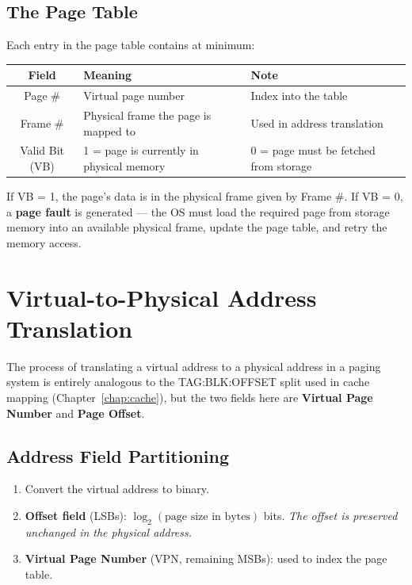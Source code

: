 \documentclass[11pt, a4paper, notitlepage]{report}
\theoremstyle{definition}
\theoremstyle{remark}
\theoremstyle{definition}
\begin{document}
\subsection{The Page Table}
\label{sec:page-table}

Each entry in the page table contains at minimum:

\begin{center}
\renewcommand{\arraystretch}{1.3}
\begin{tabularx}{\linewidth}{clX}
  \toprule
  \textbf{Field} & \textbf{Meaning} & \textbf{Note} \\
  \midrule
  Page \# & Virtual page number & Index into the table \\
  Frame \# & Physical frame the page is mapped to & Used in address translation \\
  Valid Bit (VB) & 1 = page is currently in physical memory & 0 = page must be fetched from storage \\
  \bottomrule
\end{tabularx}
\end{center}

If VB = 1, the page's data is in the physical frame given by Frame \#. If VB = 0, a \textbf{page fault} is generated — the OS must load the required page from storage memory into an available physical frame, update the page table, and retry the memory access.

\section{Virtual-to-Physical Address Translation}
\label{sec:addr-translation}

The process of translating a virtual address to a physical address in a paging system is entirely analogous to the TAG:BLK:OFFSET split used in cache mapping (Chapter~\ref{chap:cache}), but the two fields here are \textbf{Virtual Page Number} and \textbf{Page Offset}.

\subsection{Address Field Partitioning}

\begin{enumerate}
  \item Convert the virtual address to binary.
  \item \textbf{Offset field} (LSBs): $\log_2(\text{page size in bytes})$ bits. \emph{The offset is preserved unchanged in the physical address.}
  \item \textbf{Virtual Page Number} (VPN, remaining MSBs): used to index the page table.
\end{enumerate}
\end{document}

